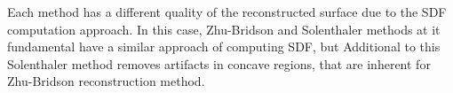 Each method has a different quality of the reconstructed surface due to the SDF computation approach. In this case, Zhu-Bridson and Solenthaler methods at it fundamental have a similar approach of computing SDF, but Additional to this Solenthaler method removes artifacts in concave regions, that are inherent for Zhu-Bridson reconstruction method.

